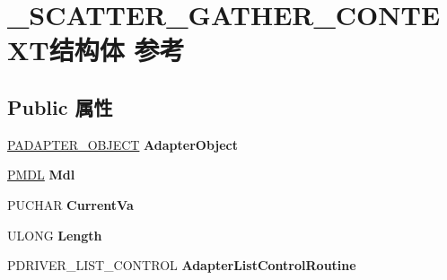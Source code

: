 \hypertarget{struct___s_c_a_t_t_e_r___g_a_t_h_e_r___c_o_n_t_e_x_t}{}\section{\+\_\+\+S\+C\+A\+T\+T\+E\+R\+\_\+\+G\+A\+T\+H\+E\+R\+\_\+\+C\+O\+N\+T\+E\+X\+T结构体 参考}
\label{struct___s_c_a_t_t_e_r___g_a_t_h_e_r___c_o_n_t_e_x_t}
\subsection*{Public 属性}
\begin{DoxyCompactItemize}
\item 
\mbox{\label{struct___s_c_a_t_t_e_r___g_a_t_h_e_r___c_o_n_t_e_x_t_a787d0ab20391b6c8e4970167b4062d2f}} 
\hyperlink{struct___d_m_a___a_d_a_p_t_e_r}{P\+A\+D\+A\+P\+T\+E\+R\+\_\+\+O\+B\+J\+E\+CT} {\bfseries Adapter\+Object}
\item 
\mbox{\label{struct___s_c_a_t_t_e_r___g_a_t_h_e_r___c_o_n_t_e_x_t_ad4886fdc62bc5d1642c44d6b4ad35984}} 
\hyperlink{interfacevoid}{P\+M\+DL} {\bfseries Mdl}
\item 
\mbox{\label{struct___s_c_a_t_t_e_r___g_a_t_h_e_r___c_o_n_t_e_x_t_a57496c0743dc41a4a5ceaa8b90c737d0}} 
P\+U\+C\+H\+AR {\bfseries Current\+Va}
\item 
\mbox{\label{struct___s_c_a_t_t_e_r___g_a_t_h_e_r___c_o_n_t_e_x_t_ae7231ee448343c8e9e7ad6266a66a889}} 
U\+L\+O\+NG {\bfseries Length}
\item 
\mbox{\label{struct___s_c_a_t_t_e_r___g_a_t_h_e_r___c_o_n_t_e_x_t_ad9c1bb00cae9ea35732109914e61946f}} 
P\+D\+R\+I\+V\+E\+R\+\_\+\+L\+I\+S\+T\+\_\+\+C\+O\+N\+T\+R\+OL {\bfseries Adapter\+List\+Control\+Routine}
\item 
\mbox{\label{struct___s_c_a_t_t_e_r___g_a_t_h_e_r___c_o_n_t_e_x_t_a3417f138164259aa6068a2a1aaaf8fa5}} 

\end{DoxyCompactItemize}
